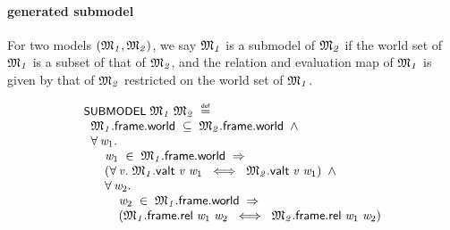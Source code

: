\documentclass[letterpaper]{article}
\renewcommand{\HOLConst}[1]{{\textsf{\upshape\small #1}}}
\renewcommand{\HOLinline}[1]{\ensuremath{#1}}
\newenvironment{holmath}{\begin{displaymath}\begin{array}{l}}{\end{array}\end{displaymath}\ignorespacesafterend}
\begin{document}
\paragraph{generated submodel}

For two models \HOLinline{(\HOLFreeVar{\ensuremath{\mathfrak{M}\sb{1}}}\HOLSymConst{,}\HOLFreeVar{\ensuremath{\mathfrak{M}\sb{2}}})}, we say \HOLinline{\HOLFreeVar{\ensuremath{\mathfrak{M}\sb{1}}}} is a submodel of \HOLinline{\HOLFreeVar{\ensuremath{\mathfrak{M}\sb{2}}}} if the world set of \HOLinline{\HOLFreeVar{\ensuremath{\mathfrak{M}\sb{1}}}} is a subset of that of \HOLinline{\HOLFreeVar{\ensuremath{\mathfrak{M}\sb{2}}}}, and the relation and evaluation map of \HOLinline{\HOLFreeVar{\ensuremath{\mathfrak{M}\sb{1}}}} is given by that of \HOLinline{\HOLFreeVar{\ensuremath{\mathfrak{M}\sb{2}}}} restricted on the world set of \HOLinline{\HOLFreeVar{\ensuremath{\mathfrak{M}\sb{1}}}}.

\begin{holmath}
  \HOLConst{SUBMODEL}\;\HOLFreeVar{\ensuremath{\mathfrak{M}\sb{1}}}\;\HOLFreeVar{\ensuremath{\mathfrak{M}\sb{2}}}\;\HOLSymConst{\HOLTokenDefEquality{}}\\
\;\;\HOLFreeVar{\ensuremath{\mathfrak{M}\sb{1}}}.\HOLFieldName{frame}.\HOLFieldName{world}\;\HOLSymConst{\HOLTokenSubset{}}\;\HOLFreeVar{\ensuremath{\mathfrak{M}\sb{2}}}.\HOLFieldName{frame}.\HOLFieldName{world}\;\HOLSymConst{\HOLTokenConj{}}\\
\;\;\HOLSymConst{\HOLTokenForall{}}\HOLBoundVar{w\sb{\mathrm{1}}}.\\
\;\;\;\;\;\;\HOLBoundVar{w\sb{\mathrm{1}}}\;\HOLSymConst{\HOLTokenIn{}}\;\HOLFreeVar{\ensuremath{\mathfrak{M}\sb{1}}}.\HOLFieldName{frame}.\HOLFieldName{world}\;\HOLSymConst{\HOLTokenImp{}}\\
\;\;\;\;\;\;(\HOLSymConst{\HOLTokenForall{}}\HOLBoundVar{v}.\;\HOLFreeVar{\ensuremath{\mathfrak{M}\sb{1}}}.\HOLFieldName{valt}\;\HOLBoundVar{v}\;\HOLBoundVar{w\sb{\mathrm{1}}}\;\HOLSymConst{\HOLTokenEquiv{}}\;\HOLFreeVar{\ensuremath{\mathfrak{M}\sb{2}}}.\HOLFieldName{valt}\;\HOLBoundVar{v}\;\HOLBoundVar{w\sb{\mathrm{1}}})\;\HOLSymConst{\HOLTokenConj{}}\\
\;\;\;\;\;\;\HOLSymConst{\HOLTokenForall{}}\HOLBoundVar{w\sb{\mathrm{2}}}.\\
\;\;\;\;\;\;\;\;\;\;\HOLBoundVar{w\sb{\mathrm{2}}}\;\HOLSymConst{\HOLTokenIn{}}\;\HOLFreeVar{\ensuremath{\mathfrak{M}\sb{1}}}.\HOLFieldName{frame}.\HOLFieldName{world}\;\HOLSymConst{\HOLTokenImp{}}\\
\;\;\;\;\;\;\;\;\;\;(\HOLFreeVar{\ensuremath{\mathfrak{M}\sb{1}}}.\HOLFieldName{frame}.\HOLFieldName{rel}\;\HOLBoundVar{w\sb{\mathrm{1}}}\;\HOLBoundVar{w\sb{\mathrm{2}}}\;\HOLSymConst{\HOLTokenEquiv{}}\;\HOLFreeVar{\ensuremath{\mathfrak{M}\sb{2}}}.\HOLFieldName{frame}.\HOLFieldName{rel}\;\HOLBoundVar{w\sb{\mathrm{1}}}\;\HOLBoundVar{w\sb{\mathrm{2}}})
\end{holmath}
\end{document}
